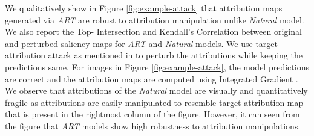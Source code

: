\documentclass[runningheads]{llncs}
\begin{document}
We qualitatively show in Figure \ref{fig:example-attack} that attribution maps generated via \textit{ART} are robust to attribution manipulation unlike \textit{Natural} model. We also report the Top- Intersection and Kendall’s Correlation between original and perturbed saliency maps for \textit{ART} and \textit{Natural} models. We use target attribution attack as mentioned in \cite{nips_sal} to perturb the attributions while keeping the predictions same. For images in Figure \ref{fig:example-attack}, the model predictions are correct and the attribution maps are computed using Integrated Gradient \cite{attr2017integrated}. We observe that attributions of the \textit{Natural} model are visually and quantitatively fragile as attributions are easily manipulated to resemble target attribution map that is present in the rightmost column of the figure. However, it can seen from the figure that \textit{ART} models show high robustness to attribution manipulations. 

\begin{table}[]
\centering
{}
\label{fig:example-attack}
\end{table}
\end{document}
